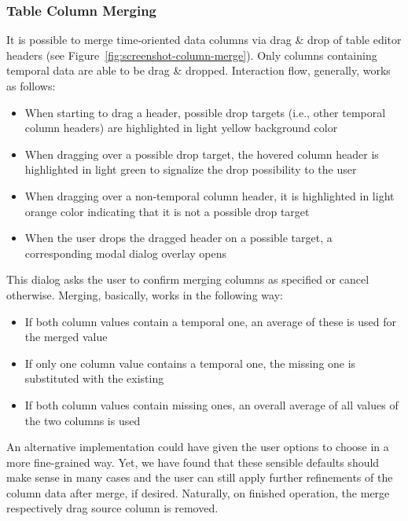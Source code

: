\subsubsection{Table Column Merging}

It is possible to merge time-oriented data columns via drag \& drop of table editor headers (see Figure~\ref{fig:screenshot-column-merge}).
Only columns containing temporal data are able to be drag \& dropped.
Interaction flow, generally, works as follows:

\begin{itemize}
  \item When starting to drag a header, possible drop targets (i.e., other temporal column headers) are highlighted in light yellow background color
  \item When dragging over a possible drop target, the hovered column header is highlighted in light green to signalize the drop possibility to the user
  \item When dragging over a non-temporal column header, it is highlighted in light orange color indicating that it is not a possible drop target
  \item When the user drops the dragged header on a possible target, a corresponding modal dialog overlay opens
\end{itemize}

This dialog asks the user to confirm merging columns as specified or cancel otherwise.
Merging, basically, works in the following way:

\begin{itemize}
  \item If both column values contain a temporal one, an average of these is used for the merged value
  \item If only one column value contains a temporal one, the missing one is substituted with the existing
  \item If both column values contain missing ones, an overall average of all values of the two columns is used
\end{itemize}

An alternative implementation could have given the user options to choose in a more fine-grained way.
Yet, we have found that these sensible defaults should make sense in many cases and the user can still apply further refinements of the column data after merge, if desired.
Naturally, on finished operation, the merge respectively drag source column is removed.

